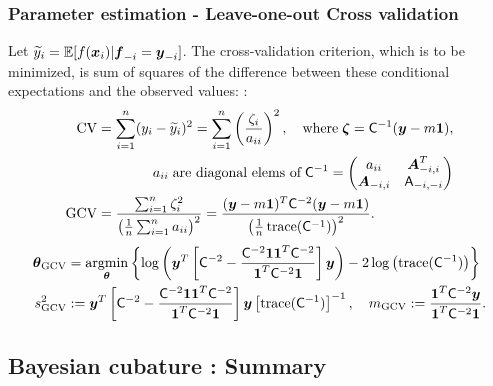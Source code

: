 \documentclass[10pt,compress,xcolor={usenames,dvipsnames}]{beamer} %
\newcommand{\bm}[1]{\boldsymbol{#1}}
\newcommand{\Ex}{\mathbb{E}}
\newcommand{\GCV}{\textup{GCV}}
\begin{document}
\begin{frame}
\frametitle{Parameter estimation - Leave-one-out Cross validation}
\vspace*{-6ex}
Let $\widetilde{y}_i = \Ex[f(\vx_i ) | \vf_{-i} = \vy_{-i}]$.
The cross-validation criterion, which is to be minimized, is sum of squares of the difference between these conditional expectations and the observed values: :
\vspace*{-2.0ex}
\begin{align*}
\textup{CV} &= \sum_{i=1}^n (y_i - \widetilde{y}_i)^2 = \sum_{i=1}^n \left(\frac{\zeta_i }{a_{ii}} \right)^2, \quad \text{where}\; \bm{\zeta} = \mC^{-1}(\vy - m \vone), 
\\
& \qquad \qquad a_{ii} \; \text{are diagonal elems of} \; \mC^{-1} = \begin{pmatrix} a_{ii}  & \vA_{-i,i}^T \\  \vA_{-i,i} & \mA_{-i,-i}\end{pmatrix}
\\
\GCV &
= \frac{\sum_{i=1}^n\zeta_i^2}{\left(\frac 1n \sum_{i=1}^n a_{ii} \right)^2} 
= \frac{(\vy - m\vone)^T \mC^{-2} (\vy - m \vone)}{\left(\frac 1n \trace(\mC^{-1}) \right)^2}.
\end{align*}
\pause
\vspace{-4ex}
\begin{align*}
\vtheta_{\GCV} &= \argmin_{\vtheta} \left\{\log \left(  \vy^T \left[\mC^{-2} - \frac{\mC^{-2} \vone \vone^T \mC^{-2}}{\vone^T \mC^{-2} \vone}  \right] \vy \right)  
- 2 \log \left ( \trace(\mC^{-1}) \right ) \right\}
\\
s^2_{\GCV} & : = \vy^T \left[\mC^{-2} - \frac{\mC^{-2} \vone \vone^T \mC^{-2}}{\vone^T \mC^{-2} \vone}  \right] \vy  \left[ \trace(\mC^{-1}) \right]^{-1}, 
\quad m_{\GCV} := \frac{\vone^T \mC^{-2} \vy}{\vone^T \mC^{-2} \vone}. 
\end{align*}
\end{frame}





\iffalse

\subsection{Bayesian cubature : Summary}
\end{document}
